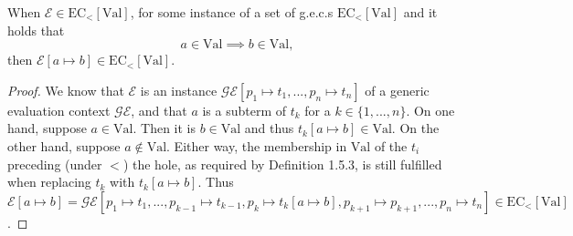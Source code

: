 \begin{lemma}
When $\mathcal{E} \in \textrm{EC}_<[{\textrm{Val}}]$, for some instance of a set of g.e.c.s $\textrm{EC}_<[\textrm{Val}]$ and it holds that
\[
a \in \textrm{Val} \implies b \in \textrm{Val},
\]
then $\mathcal{E}[a \mapsto b] \in \textrm{EC}_<[\textrm{Val}]$.

\begin{proof}
We know that $\mathcal{E}$ is an instance $\mathcal{GE}[p_1 \mapsto t_1, ..., p_n \mapsto t_n]$ of a generic evaluation context $\mathcal{GE}$, and that $a$ is a subterm of $t_k$ for a $k \in \{1, ..., n\}$. On one hand, suppose $a \in \textrm{Val}$. Then it is $b \in \textrm{Val}$ and thus $t_k[a \mapsto b] \in \textrm{Val}$. On the other hand, suppose $a \not\in \textrm{Val}$. Either way, the membership in $\textrm{Val}$ of the $t_i$ preceding (under $<$) the hole, as required by Definition 1.5.3, is still fulfilled when replacing $t_k$ with $t_k[a \mapsto b]$. Thus $\mathcal{E}[a \mapsto b] = \mathcal{GE}[p_1 \mapsto t_1, ..., p_{k-1} \mapsto t_{k-1}, p_k \mapsto t_k[a \mapsto b], p_{k+1} \mapsto p_{k+1}, ..., p_n \mapsto t_n] \in \textrm{EC}_<[\textrm{Val}]$.
\end{proof}
\end{lemma}
